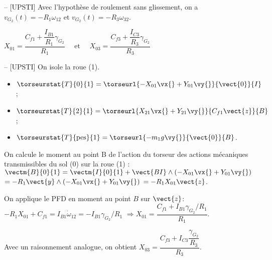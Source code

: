 \ifprof
\begin{corrige}-- [UPSTI]
Avec l’hypothèse de roulement sans glissement, on a $v_{G_2} (t)=-R_1 \omega_{12}$ et $v_{G_2 }(t)=-R_3 \omega_{32}$.
\end{corrige}
\else
\fi

$X_{01}=\dfrac{C_{f 1}+\dfrac{I_{B 1}}{R_{1}} \gamma_{G_{2}}}{R_{1}} \quad \text { et } \quad X_{03}=\dfrac{C_{f 3}+\dfrac{I_{C 3}}{R_{3}} \gamma_{G_{2}}}{R_{3}}
$
\ifprof
\begin{corrige}-- [UPSTI]
On isole la roue (1).
 
  \begin{multicols}{2}
 \begin{itemize}
\item $\torseurstat{T}{0}{1} = \torseurl{-X_{01}\vx{}+Y_{01}\vy{}}{\vect{0}}{I}$;
\item $\torseurstat{T}{2}{1} = \torseurl{X_{21}\vx{}+Y_{21}\vy{}}{C_{f1}\vect{z}}{B}$;
\item $\torseurstat{T}{\text{pes}}{1} = \torseurl{-m_1 g \vy{}}{\vect{0}}{B}$.
\end{itemize}
\end{multicols}

 
On calcule le moment au point B de l’action du torseur des actions mécaniques transmissibles du sol (0) sur la roue (1) : 
$\vectm{B}{0}{1}=\vectm{I}{0}{1} + \vect{BI}\wedge \left( -X_{01}\vx{}+Y_{01}\vy{}\right)$
$=-R_1 \vect{y} \wedge  \left( -X_{01}\vx{}+Y_{01}\vy{}\right)$
$=-R_1 X_{01}\vect{z}$.

On applique le PFD en moment au point $B$ sur $\vect{z}$:
$-R_1 X_{01}+C_{f1}=I_{B1}\dot{\omega}_{12}=-I_{B1}  \gamma_{G_2}/R_1$
$\Rightarrow  X_{01}=\dfrac{C_{f1}+I_{B1}  \gamma_{G_2}/R_1 }{R_1}$.

Avec un raisonnement analogue, on obtient $X_{03}=\dfrac{C_{f3}+I_{C3} \dfrac{\gamma_{G_2}}{R_3} }{R_3}$.


\end{corrige}
\else
\fi


